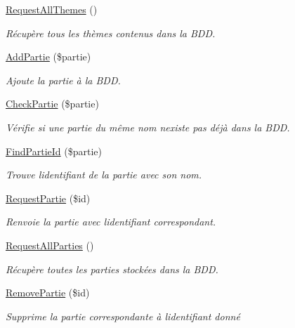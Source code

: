 \begin{DoxyCompactItemize}
\mbox{\hyperlink{class_interface_b_d_d_aaadfadb8a0a987f3d7a82dc3207e80f6}{Request\+All\+Themes}} ()
\begin{DoxyCompactList}\small\item\em Récupère tous les thèmes contenus dans la B\+DD. \end{DoxyCompactList}\item 
\mbox{\hyperlink{class_interface_b_d_d_a0bbed9af515a32afda28ca2f057d02fc}{Add\+Partie}} (\$partie)
\begin{DoxyCompactList}\small\item\em Ajoute la partie à la B\+DD. \end{DoxyCompactList}\item 
\mbox{\hyperlink{class_interface_b_d_d_a21421b30114a0f7de6e160c048c9506d}{Check\+Partie}} (\$partie)
\begin{DoxyCompactList}\small\item\em Vérifie si une partie du même nom n\textquotesingle{}existe pas déjà dans la B\+DD. \end{DoxyCompactList}\item 
\mbox{\hyperlink{class_interface_b_d_d_af667f486ba3dd4422cf48bad871f56e8}{Find\+Partie\+Id}} (\$partie)
\begin{DoxyCompactList}\small\item\em Trouve l\textquotesingle{}identifiant de la partie avec son nom. \end{DoxyCompactList}\item 
\mbox{\hyperlink{class_interface_b_d_d_a08dccbb831fa8c610a5d96158a4f38cb}{Request\+Partie}} (\$id)
\begin{DoxyCompactList}\small\item\em Renvoie la partie avec l\textquotesingle{}identifiant correspondant. \end{DoxyCompactList}\item 
\mbox{\hyperlink{class_interface_b_d_d_aa51770e0fe58671f8be78be72ab88973}{Request\+All\+Parties}} ()
\begin{DoxyCompactList}\small\item\em Récupère toutes les parties stockées dans la B\+DD. \end{DoxyCompactList}\item 
\mbox{\hyperlink{class_interface_b_d_d_a3981553b34d86dc1419002f9a9121fc6}{Remove\+Partie}} (\$id)
\begin{DoxyCompactList}\small\item\em Supprime la partie correspondante à l\textquotesingle{}identifiant donné \end{DoxyCompactList}\item 

\end{DoxyCompactItemize}
